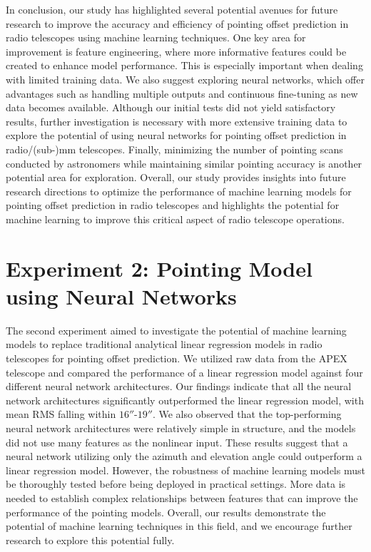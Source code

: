 In conclusion, our study has highlighted several potential avenues for future research to improve the accuracy and efficiency of pointing offset prediction in radio telescopes using machine learning techniques.
One key area for improvement is feature engineering, where more informative features could be created to enhance model performance.
This is especially important when dealing with limited training data.
We also suggest exploring neural networks, which offer advantages such as handling multiple outputs and continuous fine-tuning as new data becomes available.
Although our initial tests did not yield satisfactory results,
further investigation is necessary with more extensive training data to explore the potential of using neural networks for pointing offset prediction in radio/(sub-)mm telescopes.
Finally, minimizing the number of pointing scans conducted by astronomers while maintaining similar pointing accuracy is another potential area for exploration.
Overall, our study provides insights into future research directions to optimize the performance of machine learning models for pointing offset prediction in radio telescopes and highlights the potential for machine learning to improve this critical aspect of radio telescope operations.

\section{Experiment 2: Pointing Model using Neural Networks}
The second experiment aimed to investigate the potential of machine learning models to replace traditional analytical linear regression models in radio telescopes for pointing offset prediction.
We utilized raw data from the APEX telescope and compared the performance of a linear regression model against four different neural network architectures.
Our findings indicate that all the neural network architectures significantly outperformed the linear regression model, with mean RMS falling within $16''$-$19''$.
We also observed that the top-performing neural network architectures were relatively simple in structure, and the models did not use many features as the nonlinear input.
These results suggest that a neural network utilizing only the azimuth and elevation angle could outperform a linear regression model.
However, the robustness of machine learning models must be thoroughly tested before being deployed in practical settings. More data is needed to establish complex relationships between features that can improve the performance of the pointing models.
Overall, our results demonstrate the potential of machine learning techniques in this field, and we encourage further research to explore this potential fully.